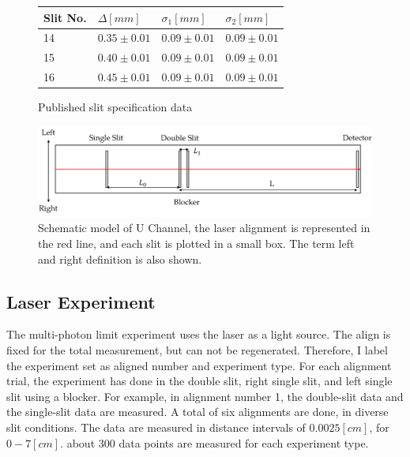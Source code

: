 \documentclass{article}
\begin{document}
\begin{figure}[H]
    \centering
    \begin{tabular}{  |m{2cm} | m{2.5cm} | m{2.5cm} | m{2.5cm}|  } 
      \hline
      Slit No.& $\Delta [mm]$& $\sigma_1 [mm]$ & $\sigma_2 [mm]$ \\ 
      \hline
      \hline
        14 & $ 0.35 \pm 0.01$& $0.09 \pm 0.01$ & $0.09 \pm 0.01$\\
      \hline
        15 & $ 0.40 \pm 0.01 $& $0.09 \pm 0.01$ & $0.09 \pm 0.01$\\
      \hline
       16 &$ 0.45 \pm 0.01 $& $0.09 \pm 0.01$ & $0.09 \pm 0.01$\\
       \hline

    \end{tabular}
    \caption{Published slit specification data}
    \label{fig: slit_specs_data}
\end{figure}

\begin{figure}[H]
    \centering
    \includegraphics[width=13cm]{../results/u_channel_spec.png}
    \hfill
    \caption{
        Schematic model of U Channel, the laser alignment is represented in the red line, and each slit is plotted in a small box.
        The term left and right definition is also shown.
    }
    \label{fig: u_channel_specs}
\end{figure}
 
\subsection{Laser Experiment}
The multi-photon limit experiment uses the laser as a light source.
The align is fixed for the total measurement, but can not be regenerated.
Therefore, I label the experiment set as aligned number and experiment type.
For each alignment trial, the experiment has done in the double slit, right single slit, and left single slit using a blocker.
For example, in alignment number 1, the double-slit data and the single-slit data are measured.
A total of six alignments are done, in diverse slit conditions.
The data are measured in distance intervals of $0.0025 [cm]$, for $0 - 7 [cm]$. about 300 data points are measured for each experiment type.
\end{document}
